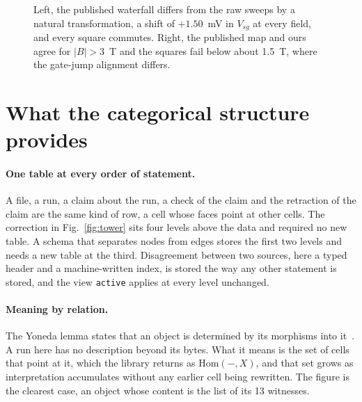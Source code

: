 \documentclass[11pt]{article}
\newcommand{\cellname}[1]{\texttt{#1}}
\begin{document}
\begin{figure}[h]
\centering
{}
\hspace{5em}
\caption{Left, the published waterfall differs from the raw sweeps by a natural transformation, a shift of $+1.50$~mV in $V_{sg}$ at every field, and every square commutes. Right, the published map and ours agree for $|B|>3$~T and the squares fail below about 1.5~T, where the gate-jump alignment differs.}
\label{fig:natural}
\end{figure}

\section{What the categorical structure provides}

\paragraph{One table at every order of statement.} A file, a run, a claim about the run, a check of the claim and the retraction of the claim are the same kind of row, a cell whose faces point at other cells. The correction in Fig.~\ref{fig:tower} sits four levels above the data and required no new table. A schema that separates nodes from edges stores the first two levels and needs a new table at the third. Disagreement between two sources, here a typed header and a machine-written index, is stored the way any other statement is stored, and the view \cellname{active} applies at every level unchanged.

\paragraph{Meaning by relation.} The Yoneda lemma states that an object is determined by its morphisms into it~\cite{MacLane1998-cwm,Riehl2016-context}. A run here has no description beyond its bytes. What it means is the set of cells that point at it, which the library returns as $\mathrm{Hom}(-,X)$, and that set grows as interpretation accumulates without any earlier cell being rewritten. The figure is the clearest case, an object whose content is the list of its 13 witnesses.
\end{document}
